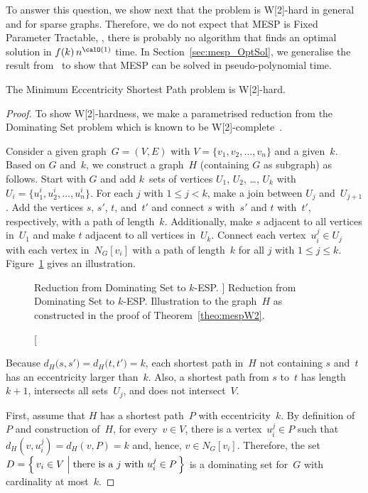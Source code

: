 To answer this question, we show next that the problem is W[2]-hard in general and for sparse graphs.
Therefore, we do not expect that MESP is Fixed Parameter Tractable, \ie, there is probably no algorithm that finds an optimal solution in $f(k) \, n^{\calO(1)}$ time.
In Section~\ref{sec:mesp_OptSol}, we generalise the result from~\cite{Kratsch2000} to show that MESP can be solved in pseudo-polynomial time.

\begin{theorem}
    \label{theo:mespW2}
The Minimum Eccentricity Shortest Path problem is W[2]-hard.
\end{theorem}

\begin{proof}
To show W[2]-hardness, we make a parametrised reduction from the Dominating Set problem which is known to be W[2]-complete~\cite{DowneyFellow2013}.

Consider a given graph~$G = (V, E)$ with $V = \{ v_1, v_2, \ldots, v_n \}$ and a given~$k$.
Based on $G$ and~$k$, we construct a graph~$H$ (containing $G$ as subgraph) as follows.
Start with $G$ and add $k$~sets of vertices $U_1$, $U_2$, \dots, $U_k$ with $U_i = \Big \{ u^i_1, u^i_2, \ldots, u^i_n \Big \}$.
For each $j$ with $1 \leq j < k$, make a join between $U_j$ and~$U_{j+1}$.
Add the vertices $s$, $s'$, $t$, and~$t'$ and connect $s$ with~$s'$ and $t$ with~$t'$, respectively, with a path of length~$k$.
Additionally, make $s$ adjacent to all vertices in~$U_1$ and make $t$ adjacent to all vertices in~$U_k$.
Connect each vertex~$u_i^j \in U_j$ with each vertex in~$N_G[v_i]$ with a path of length~$k$ for all $j$ with $1 \leq j \leq k$.
Figure~\ref{fig:mespW2} gives an illustration.

\begin{figure}
    [htb]
    \centering
    
    \caption
    [%
        Reduction from Dominating Set to $k$-ESP.
    ]
    {
        Reduction from Dominating Set to $k$-ESP.
        Illustration to the graph~$H$ as constructed in the proof of Theorem~\ref{theo:mespW2}.
    }
    \label{fig:mespW2}
\end{figure}


Because $d_H \big( s, s' \big) = d_H \big( t, t' \big) = k$, each shortest path in~$H$ not containing $s$ and~$t$ has an eccentricity larger than~$k$.
Also, a shortest path from $s$ to~$t$ has length $k + 1$, intersects all sets~$U_j$, and does not intersect~$V$.

First, assume that $H$ has a shortest path~$P$ with eccentricity~$k$.
By definition of~$P$ and construction of~$H$, for every~$v \in V$, there is a vertex~$u_i^j \in P$ such that $d_H \! \left( v, u_i^j \right) = d_H(v, P) = k$ and, hence, $v \in N_G[v_i]$.
Therefore, the set $D = \Big \{ \, v_i \in V \Bigm| \text{there is a $j$ with $u_i^j \in P$} \, \Big \}$ is a dominating set for~$G$ with cardinality at most~$k$.


\end{proof}
